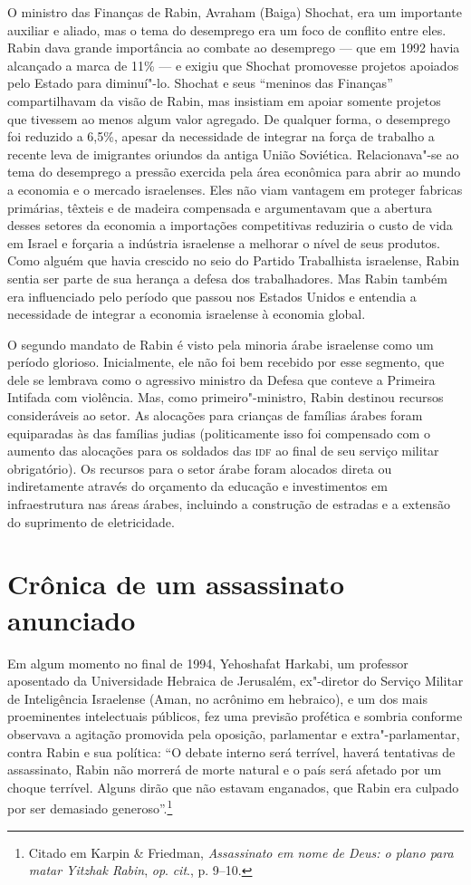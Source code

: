 O ministro das Finanças de Rabin, Avraham (Baiga) Shochat, era um
importante auxiliar e aliado, mas o tema do desemprego era um foco de
conflito entre eles. Rabin dava grande importância ao combate ao
desemprego --- que em 1992 havia alcançado a marca de 11\% --- e exigiu que
Shochat promovesse projetos apoiados pelo Estado para diminuí"-lo.
Shochat e seus ``meninos das Finanças'' compartilhavam da visão de Rabin,
mas insistiam em apoiar somente projetos que tivessem ao menos algum
valor agregado. De qualquer forma, o desemprego foi reduzido a 6,5\%,
apesar da necessidade de integrar na força de trabalho a recente leva de
imigrantes oriundos da antiga União Soviética. Relacionava"-se ao tema do
desemprego a pressão exercida pela área econômica para abrir ao mundo a
economia e o mercado israelenses. Eles não viam vantagem em proteger
fabricas primárias, têxteis e de madeira compensada e argumentavam que a
abertura desses setores da economia a importações competitivas reduziria
o custo de vida em Israel e forçaria a indústria israelense a melhorar o
nível de seus produtos. Como alguém que havia crescido no seio do
Partido Trabalhista israelense, Rabin sentia ser parte de sua herança a
defesa dos trabalhadores. Mas Rabin também era influenciado pelo período
que passou nos Estados Unidos e entendia a necessidade de integrar a
economia israelense à economia global.

O segundo mandato de Rabin é visto pela minoria árabe israelense como um
período glorioso. Inicialmente, ele não foi bem recebido por esse
segmento, que dele se lembrava como o agressivo ministro da Defesa que
conteve a Primeira Intifada com violência. Mas, como primeiro"-ministro,
Rabin destinou recursos consideráveis ao setor. As alocações para
crianças de famílias árabes foram equiparadas às das famílias judias
(politicamente isso foi compensado com o aumento das alocações para os
soldados das \textsc{idf} ao final de seu serviço militar obrigatório). Os
recursos para o setor árabe foram alocados direta ou indiretamente
através do orçamento da educação e investimentos em infraestrutura nas
áreas árabes, incluindo a construção de estradas e a extensão do
suprimento de eletricidade.

\section{Crônica de um assassinato anunciado}

Em algum momento no final de 1994, Yehoshafat Harkabi, um professor
aposentado da Universidade Hebraica de Jerusalém, ex"-diretor do Serviço
Militar de Inteligência Israelense (Aman, no acrônimo em hebraico), e um dos mais proeminentes intelectuais
públicos, fez uma previsão profética e sombria conforme observava a
agitação promovida pela oposição, parlamentar e extra"-parlamentar,
contra Rabin e sua política: ``O debate interno será terrível, haverá
tentativas de assassinato, Rabin não morrerá de morte natural e o país
será afetado por um choque terrível. Alguns dirão que não estavam
enganados, que Rabin era culpado por ser demasiado generoso''.\footnote{Citado em Karpin
\& Friedman, \textit{Assassinato em nome de Deus: o plano para matar Yitzhak
Rabin}, \textit{op}. \textit{cit}., p. 9--10.}

